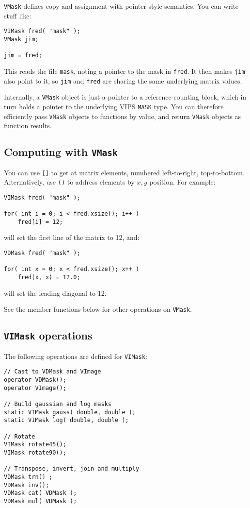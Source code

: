 \verb+VMask+ defines copy and assignment with pointer-style
semantics. You can write stuff like:

\begin{verbatim}
VIMask fred( "mask" );
VMask jim;

jim = fred;
\end{verbatim}

This reads the file \verb+mask+, noting a pointer to the mask in \verb+fred+.
It then makes \verb+jim+ also point to it, so \verb+jim+ and \verb+fred+ are
sharing the same underlying matrix values.  

Internally, a \verb+VMask+ object is just a pointer to a reference-counting
block, which in turn holds a pointer to the underlying VIPS \verb+MASK+ type.
You can therefore efficiently pass \verb+VMask+ objects to functions by
value, and return \verb+VMask+ objects as function results.

\subsection{Computing with \texttt{VMask}}

You can use \verb+[]+ to get at matrix elements, numbered left-to-right,
top-to-bottom. Alternatively, use \verb+()+ to address elements by $x,y$
position. For example:

\begin{verbatim}
VIMask fred( "mask" );

for( int i = 0; i < fred.xsize(); i++ )
    fred[i] = 12;
\end{verbatim}

\noindent
will set the first line of the matrix to 12, and:

\begin{verbatim}
VDMask fred( "mask" );

for( int x = 0; x < fred.xsize(); x++ )
    fred(x, x) = 12.0;
\end{verbatim}

\noindent
will set the leading diagonal to 12.

See the member functions below for other operations on \verb+VMask+.

\subsection{\texttt{VIMask} operations}

The following operations are defined for \verb+VIMask+:

\begin{verbatim}
// Cast to VDMask and VImage
operator VDMask();
operator VImage();

// Build gaussian and log masks
static VIMask gauss( double, double );
static VIMask log( double, double );

// Rotate
VIMask rotate45();
VIMask rotate90();

// Transpose, invert, join and multiply
VDMask trn() ;
VDMask inv();
VDMask cat( VDMask );
VDMask mul( VDMask );
\end{verbatim}

